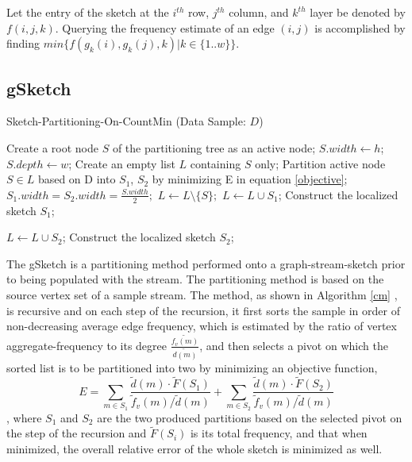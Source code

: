 Let the entry of the sketch at the $i^{th}$ row, $j^{th}$ column, and $k^{th}$ layer be denoted by $f(i,j,k)$. Querying the frequency estimate of an edge $(i,j)$ is accomplished by finding $min\{f(g_k(i),g_k(j),k)|k \in \{1..w\}\}$.

\subsection{gSketch}
\begin{algorithm}
\caption{Sketch-Partitioning-On-CountMin \cite{DBLP} (Data Sample: $D$)}\label{cm}
\begin{algorithmic}[1]

\State Create a root node $S$ of the partitioning tree as an
active node;
\State $S.width \gets h$;
\State $S.depth \gets w$;
\State Create an empty list $L$ containing $S$ only;
\State Partition active node $S \in L$ based on D into $S_1$, $S_2$ by minimizing E in equation \ref{objective};
\State $S_1.width = S_2.width = \frac{S.width}{2};$
\State $L \gets L \setminus \{ S \};$
\State $L \gets L \cup S_1$;
\Else
\State Construct the localized sketch $S_1$;
\EndIf

\State $L \gets L \cup S_2$;
\Else
\State Construct the localized sketch $S_2$;
\EndIf

\EndWhile

\end{algorithmic}
\end{algorithm}
The gSketch\cite{DBLP} is a partitioning method performed onto a graph-stream-sketch prior to being populated with the stream. The partitioning method is based on the source vertex set of a sample stream. The method, as shown in Algorithm \ref{cm} \cite{DBLP}, is recursive and on each step of the recursion, it first sorts the sample in order of non-decreasing average edge frequency, which is estimated by the ratio of vertex aggregate-frequency to its degree $\frac{\tilde{f_v(m)}}{\tilde{d(m)}}$, and then selects a pivot on which the sorted list is to be partitioned into two by minimizing an objective function,
\begin{equation}
\label{objective}
E = \sum_{m \in S_1} \frac{\tilde{d}(m) \cdot \tilde{F}(S_1)}{\tilde{f}_v(m) / \tilde{d}(m)} + \sum_{m \in S_2} \frac{\tilde{d}(m) \cdot \tilde{F}(S_2)}{\tilde{f}_v(m) / \tilde{d}(m)}
\end{equation}, where $S_1$ and $S_2$ are the two produced partitions based on the selected pivot on the step of the recursion and $\tilde{F}(S_i)$ is its total frequency, and that when minimized, the overall relative error of the whole sketch is minimized as well.

